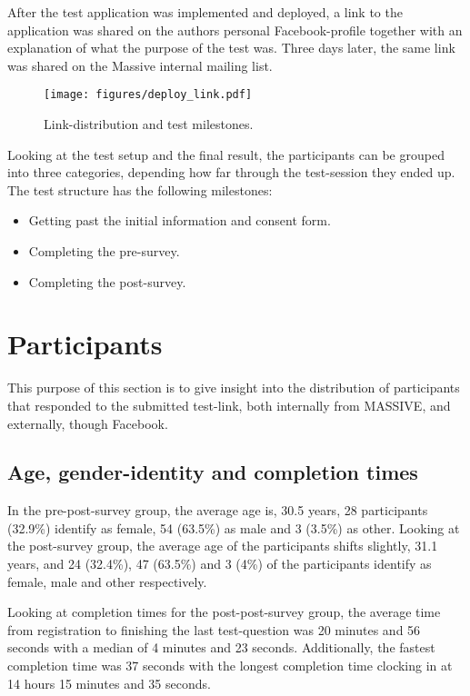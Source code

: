 After the test application was implemented and deployed, a link to the
application was shared on the authors personal Facebook-profile together
with an explanation of what the purpose of the test was. Three days
later, the same link was shared on the Massive internal mailing list.

\begin{figure}[h!]
  \centering
  \texttt{[image: figures/deploy\_link.pdf]}
  \caption{Link-distribution and test milestones.}
  \label{label_milestones}
\end{figure}

Looking at the test setup and the final result, the participants can be
grouped into three categories, depending how far through the test-session
they ended up. The test structure has the following milestones:
\begin{itemize}
  \item{Getting past the initial information and consent form.}
  \item{Completing the pre-survey.}
  \item{Completing the post-survey.}
\end{itemize}

\section{Participants}

	This purpose of this section is to give insight into the distribution of
	participants that responded to the submitted test-link, both internally from
	MASSIVE, and externally, though Facebook.

  \subsection{Age, gender-identity and completion times}

  In the pre-post-survey group, the average age is, 30.5 years, 28
  participants (32.9\%) identify as female, 54 (63.5\%) as male and 3
  (3.5\%) as other. Looking at the post-survey group, the average age of
  the participants shifts slightly, 31.1 years, and 24 (32.4\%), 47
  (63.5\%) and 3 (4\%) of the participants identify as female, male and
  other respectively.

  Looking at completion times for the post-post-survey group, the average
  time from registration to finishing the last test-question was 20 minutes
  and 56 seconds with a median of 4 minutes and 23 seconds. Additionally,
  the fastest completion time was 37 seconds with the longest completion
  time clocking in at 14 hours 15 minutes and 35 seconds.

